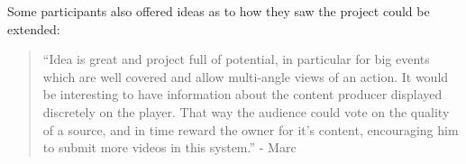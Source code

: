 Some participants also offered ideas as to how they saw the project could be extended:

\begin{quote}
  ``Idea is great and project full of potential, in particular for big events which are well covered and allow multi-angle views of an action. It would be interesting to have information about the content producer displayed discretely on the player. That way the audience could vote on the quality of a source, and in time reward the owner for it's content, encouraging him to submit more videos in this system.'' - Marc
\end{quote}








